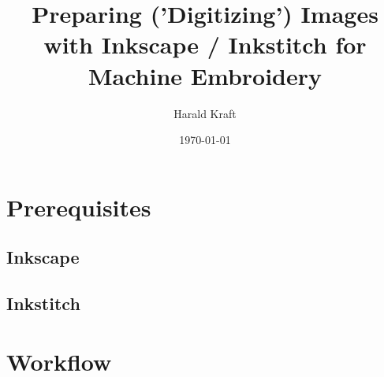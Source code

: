 \documentclass{article}
\title{Preparing ('Digitizing') Images with Inkscape / Inkstitch for Machine Embroidery}
\author{Harald Kraft}
\date{\today}
\begin{document}
    \maketitle

    \tableofcontents

    \pagebreak

    \section{Prerequisites}
        \subsection{Inkscape}

        \subsection{Inkstitch}
    
        \pagebreak
    \section{Workflow}
\end{document}
